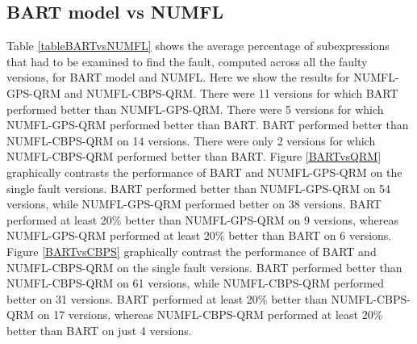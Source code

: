 \subsection{BART model vs NUMFL}
Table \ref{tableBARTvsNUMFL} shows the average percentage of subexpressions that had to be examined to find the fault, computed across all the faulty versions, for BART model and NUMFL.  Here we show the results for NUMFL-GPS-QRM and NUMFL-CBPS-QRM.   There were 11 versions for which BART performed better than NUMFL-GPS-QRM. There were 5 versions for which NUMFL-GPS-QRM performed better than BART. BART performed better than NUMFL-CBPS-QRM on 14 versions. There were only 2 versions for which NUMFL-CBPS-QRM performed better than BART. Figure \ref{BARTvsQRM} graphically contrasts the performance of BART and NUMFL-GPS-QRM on the single fault versions.  BART performed better than NUMFL-GPS-QRM on 54 versions, while NUMFL-GPS-QRM performed better on 38 versions.  BART performed at least 20\% better than NUMFL-GPS-QRM on 9 versions, whereas NUMFL-GPS-QRM performed at least 20\% better than BART on 6 versions. Figure \ref{BARTvsCBPS} graphically contrast the performance of BART and NUMFL-CBPS-QRM on the single fault versions.  BART performed better than NUMFL-CBPS-QRM on 61 versions, while NUMFL-CBPS-QRM performed better on 31 versions.  BART performed at least 20\% better than NUMFL-CBPS-QRM on 17 versions, whereas NUMFL-CBPS-QRM performed at least 20\% better than BART on just 4 versions.

